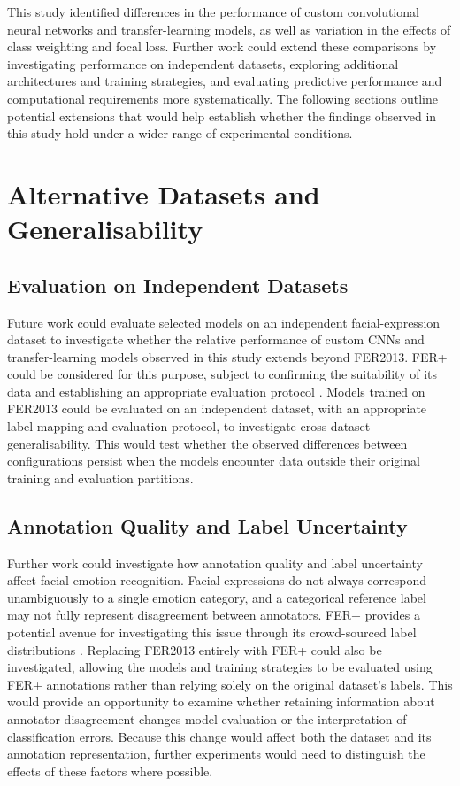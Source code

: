 \documentclass[12pt, a4paper]{report}
\let\oldsection\section
\renewcommand{\section}{%
    \Needspace{6\baselineskip}%
    \oldsection
}
\let\oldsubsection\subsection
\renewcommand{\subsection}{%
    \Needspace{6\baselineskip}%
    \oldsubsection
}
\begin{document}
		This study identified differences in the performance of custom convolutional neural networks and transfer-learning models, as well as variation in the effects of class weighting and focal loss. Further work could extend these comparisons by investigating performance on independent datasets, exploring additional architectures and training strategies, and evaluating predictive performance and computational requirements more systematically. The following sections outline potential extensions that would help establish whether the findings observed in this study hold under a wider range of experimental conditions.
		
		\section{Alternative Datasets and Generalisability}
			
			\subsection{Evaluation on Independent Datasets}
				
				Future work could evaluate selected models on an independent facial-expression dataset to investigate whether the relative performance of custom CNNs and transfer-learning models observed in this study extends beyond FER2013. FER+ could be considered for this purpose, subject to confirming the suitability of its data and establishing an appropriate evaluation protocol \cite{Barsoum2016FERPlus}. Models trained on FER2013 could be evaluated on an independent dataset, with an appropriate label mapping and evaluation protocol, to investigate cross-dataset generalisability. This would test whether the observed differences between configurations persist when the models encounter data outside their original training and evaluation partitions.
				
			\newpage
			\subsection{Annotation Quality and Label Uncertainty}
				
				Further work could investigate how annotation quality and label uncertainty affect facial emotion recognition. Facial expressions do not always correspond unambiguously to a single emotion category, and a categorical reference label may not fully represent disagreement between annotators. FER+ provides a potential avenue for investigating this issue through its crowd-sourced label distributions \cite{Barsoum2016FERPlus}. Replacing FER2013 entirely with FER+ could also be investigated, allowing the models and training strategies to be evaluated using FER+ annotations rather than relying solely on the original dataset's labels. This would provide an opportunity to examine whether retaining information about annotator disagreement changes model evaluation or the interpretation of classification errors. Because this change would affect both the dataset and its annotation representation, further experiments would need to distinguish the effects of these factors where possible.
				
\end{document}
